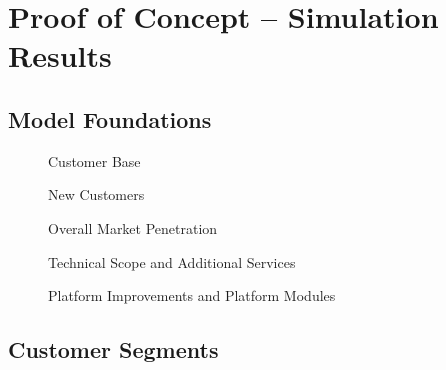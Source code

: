 \chapter{Proof of Concept -- Simulation Results}\label{ch:app05}

\section{Model Foundations}\label{ch:app05:mf}

\begin{figure}[htb]
	\centering
	
	\caption{Customer Base}
\end{figure}

\begin{figure}[htb]
	\centering
	
	\caption{New Customers}
\end{figure}

\begin{figure}[htb]
	\centering
	
	\caption{Overall Market Penetration}
\end{figure}

\begin{figure}[htb]
	\centering
	
	\caption{Technical Scope and Additional Services}
\end{figure}

\begin{figure}[htb]
	\centering
	
	\caption{Platform Improvements and Platform Modules}
\end{figure}

\clearpage
\section{Customer Segments}\label{ch:app05:cs}

